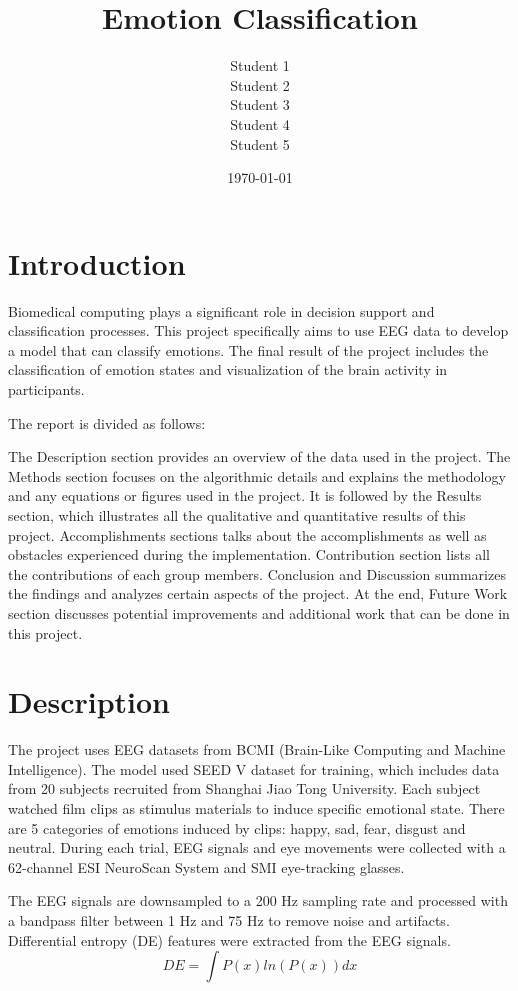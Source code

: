 \documentclass[12pt, a4paper]{report}
\title{Emotion Classification}
\author{Student 1 \\ Student 2 \\ Student 3 \\ Student 4 \\ Student 5}
\date{\today}
\begin{document}
\maketitle
\tableofcontents
\newpage


\section{Introduction}
Biomedical computing plays a significant role in decision support and classification processes. This project specifically aims to use EEG data to develop a model that can classify emotions. The final result of the project includes the classification of emotion states and visualization of the brain activity in participants. 

The report is divided as follows:

The Description section provides an overview of the data used in the project. The Methods section focuses on the algorithmic details and explains the methodology and any equations or figures used in the project. It is followed by the Results section, which illustrates all the qualitative and quantitative results of this project. Accomplishments sections talks about the accomplishments as well as obstacles experienced during the implementation. Contribution section lists all the contributions of each group members. Conclusion and Discussion summarizes the findings and analyzes certain aspects of the project. At the end, Future Work section discusses potential improvements and additional work that can be done in this project.


\section{Description}
The project uses EEG datasets from BCMI (Brain-Like Computing and Machine Intelligence). The model used SEED V dataset for training, which includes data from 20 subjects recruited from Shanghai Jiao Tong University. Each subject watched film clips as stimulus materials to induce specific emotional state. There are 5 categories of emotions induced by clips: happy, sad, fear, disgust and neutral. During each trial, EEG signals and eye movements were collected with a 62-channel ESI NeuroScan System and SMI eye-tracking glasses. 

The EEG signals are downsampled to a 200 Hz sampling rate and processed with a bandpass filter between 1 Hz and 75 Hz to remove noise and artifacts. Differential entropy (DE) features were extracted from the EEG signals.
\[DE = \int P(x) ln(P(x)) dx\]
\end{document}
